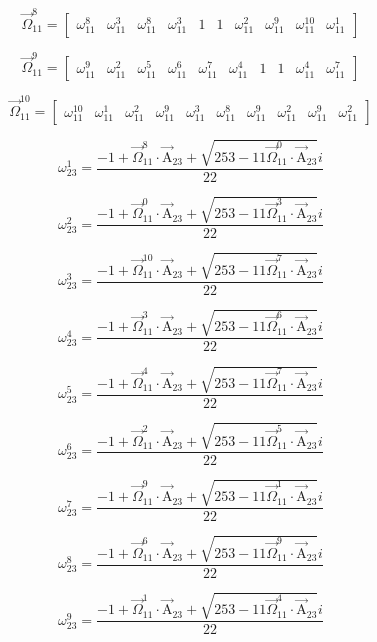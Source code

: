 \documentclass{article}
\begin{document}
\begin{enumerate}
\[ \overrightarrow{\Omega}_{11}^{8}=\left[ \begin{matrix} \omega_{11}^{8} & \omega_{11}^{3} & \omega_{11}^{8} & \omega_{11}^{3} & 1 & 1 & \omega_{11}^{2} & \omega_{11}^{9} & \omega_{11}^{10} & \omega_{11}^{1} \end{matrix} \right] \]

\[ \overrightarrow{\Omega}_{11}^{9}=\left[ \begin{matrix} \omega_{11}^{9} & \omega_{11}^{2} & \omega_{11}^{5} & \omega_{11}^{6} & \omega_{11}^{7} & \omega_{11}^{4} & 1 & 1 & \omega_{11}^{4} & \omega_{11}^{7} \end{matrix} \right] \]

\[ \overrightarrow{\Omega}_{11}^{10}=\left[ \begin{matrix} \omega_{11}^{10} & \omega_{11}^{1} & \omega_{11}^{2} & \omega_{11}^{9} & \omega_{11}^{3} & \omega_{11}^{8} & \omega_{11}^{9} & \omega_{11}^{2} & \omega_{11}^{9} & \omega_{11}^{2} \end{matrix} \right] \]

\[ \omega_{23}^{1}=\frac{-1+\vec{\Omega}_{11}^{8}\cdot\vec{\mathrm{A}}_{23}+\sqrt{253-11\vec{\Omega}_{11}^{0}\cdot\vec{\mathrm{A}}_{23}}i}{22} \]

\[ \omega_{23}^{2}=\frac{-1+\vec{\Omega}_{11}^{0}\cdot\vec{\mathrm{A}}_{23}+\sqrt{253-11\vec{\Omega}_{11}^{3}\cdot\vec{\mathrm{A}}_{23}}i}{22} \]

\[ \omega_{23}^{3}=\frac{-1+\vec{\Omega}_{11}^{10}\cdot\vec{\mathrm{A}}_{23}+\sqrt{253-11\vec{\Omega}_{11}^{7}\cdot\vec{\mathrm{A}}_{23}}i}{22} \]

\[ \omega_{23}^{4}=\frac{-1+\vec{\Omega}_{11}^{3}\cdot\vec{\mathrm{A}}_{23}+\sqrt{253-11\vec{\Omega}_{11}^{6}\cdot\vec{\mathrm{A}}_{23}}i}{22} \]

\[ \omega_{23}^{5}=\frac{-1+\vec{\Omega}_{11}^{4}\cdot\vec{\mathrm{A}}_{23}+\sqrt{253-11\vec{\Omega}_{11}^{7}\cdot\vec{\mathrm{A}}_{23}}i}{22} \]

\[ \omega_{23}^{6}=\frac{-1+\vec{\Omega}_{11}^{2}\cdot\vec{\mathrm{A}}_{23}+\sqrt{253-11\vec{\Omega}_{11}^{5}\cdot\vec{\mathrm{A}}_{23}}i}{22} \]

\[ \omega_{23}^{7}=\frac{-1+\vec{\Omega}_{11}^{9}\cdot\vec{\mathrm{A}}_{23}+\sqrt{253-11\vec{\Omega}_{11}^{1}\cdot\vec{\mathrm{A}}_{23}}i}{22} \]

\[ \omega_{23}^{8}=\frac{-1+\vec{\Omega}_{11}^{6}\cdot\vec{\mathrm{A}}_{23}+\sqrt{253-11\vec{\Omega}_{11}^{9}\cdot\vec{\mathrm{A}}_{23}}i}{22} \]

\[ \omega_{23}^{9}=\frac{-1+\vec{\Omega}_{11}^{1}\cdot\vec{\mathrm{A}}_{23}+\sqrt{253-11\vec{\Omega}_{11}^{4}\cdot\vec{\mathrm{A}}_{23}}i}{22} \]


\end{enumerate}
\end{document}
